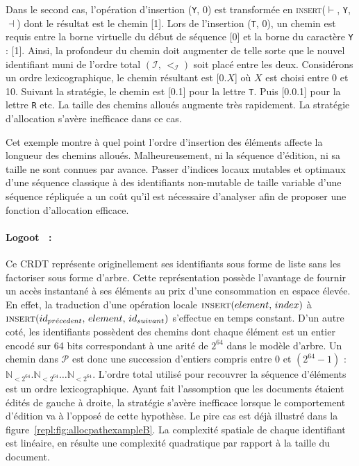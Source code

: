 Dans le second cas, l'opération d'insertion (\texttt{Y}, 0) est transformée en
\textsc{insert}($\vdash$, \texttt{Y}, $\dashv$) dont le résultat est le chemin
[1]. Lors de l'insertion (\texttt{T}, 0), un chemin est requis entre la borne
virtuelle du début de séquence [0] et la borne du caractère \texttt{Y} :
[1]. Ainsi, la profondeur du chemin doit augmenter de telle sorte que le nouvel
identifiant muni de l'ordre total $(\mathcal{I},\,<_\mathcal{I})$ soit placé
entre les deux. Considérons un ordre lexicographique, le chemin résultant est
[0.$X$] où $X$ est choisi entre 0 et 10. Suivant la stratégie, le chemin est
[0.1] pour la lettre \texttt{T}. Puis [0.0.1] pour la lettre \texttt{R} etc. La
taille des chemins alloués augmente très rapidement.  La stratégie d'allocation
s'avère inefficace dans ce cas.

Cet exemple montre à quel point l'ordre d'insertion des éléments affecte la
longueur des chemins alloués. Malheureusement, ni la séquence d'édition, ni sa
taille ne sont connues par avance.  Passer d'indices locaux mutables et optimaux
d'une séquence classique à des identifiants non-mutable de taille variable d'une
séquence répliquée a un coût qu'il est nécessaire d'analyser afin de proposer
une fonction d'allocation efficace.

\paragraph{Logoot~\cite{weiss2010collaborative, weiss2009logoot,
    weiss2010logootundo} :} Ce CRDT représente originellement ses identifiants
sous forme de liste sans les factoriser sous forme d'arbre. Cette représentation
possède l'avantage de fournir un accès instantané à ses éléments au prix d'une
consommation en espace élevée. En effet, la traduction d'une opération locale
$\textsc{insert}(element,\, index)$ à
$\textsc{insert}(id_{pr\acute{e}cedent},\, element,\, id_{suivant})$ s'effectue
en temps constant. D'un autre coté, les identifiants possèdent des chemins dont
chaque élément est un entier encodé sur 64 bits correspondant à une arité de
$2^{64}$ dans le modèle d'arbre. Un chemin dans $\mathcal{P}$ est donc une
succession d'entiers compris entre 0 et $(2^{64}-1)$ :
$\mathbb{N}_{<2^{64}}.\mathbb{N}_{<2^{64}}\ldots\mathbb{N}_{<2^{64}}$.  L'ordre
total utilisé pour recouvrer la séquence d'éléments est un ordre
lexicographique. Ayant fait l'assomption que les documents étaient édités de
gauche à droite, la stratégie s'avère inefficace lorsque le comportement
d'édition va à l'opposé de cette hypothèse. Le pire cas est déjà illustré dans
la figure~\ref{repl:fig:allocpathexampleB}. La complexité spatiale de chaque
identifiant est linéaire, en résulte une complexité quadratique par rapport à la
taille du document.

